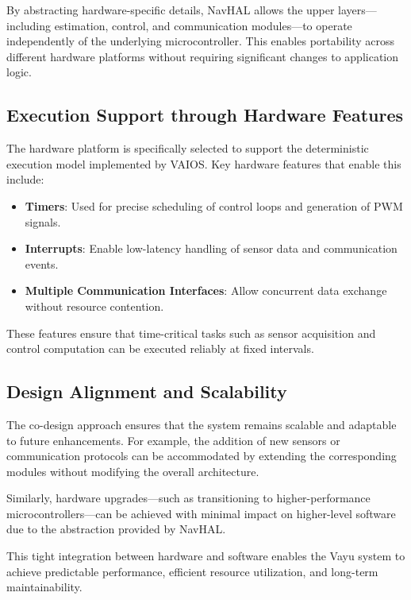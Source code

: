 By abstracting hardware-specific details, NavHAL allows the upper layers—including estimation, control, and communication modules—to operate independently of the underlying microcontroller. This enables portability across different hardware platforms without requiring significant changes to application logic.

\subsection{Execution Support through Hardware Features}

The hardware platform is specifically selected to support the deterministic execution model implemented by VAIOS. Key hardware features that enable this include:

\begin{itemize}
    \item \textbf{Timers}: Used for precise scheduling of control loops and generation of PWM signals.
    \item \textbf{Interrupts}: Enable low-latency handling of sensor data and communication events.
    \item \textbf{Multiple Communication Interfaces}: Allow concurrent data exchange without resource contention.
\end{itemize}

These features ensure that time-critical tasks such as sensor acquisition and control computation can be executed reliably at fixed intervals.

\subsection{Design Alignment and Scalability}

The co-design approach ensures that the system remains scalable and adaptable to future enhancements. For example, the addition of new sensors or communication protocols can be accommodated by extending the corresponding modules without modifying the overall architecture.

Similarly, hardware upgrades—such as transitioning to higher-performance microcontrollers—can be achieved with minimal impact on higher-level software due to the abstraction provided by NavHAL.

This tight integration between hardware and software enables the Vayu system to achieve predictable performance, efficient resource utilization, and long-term maintainability.